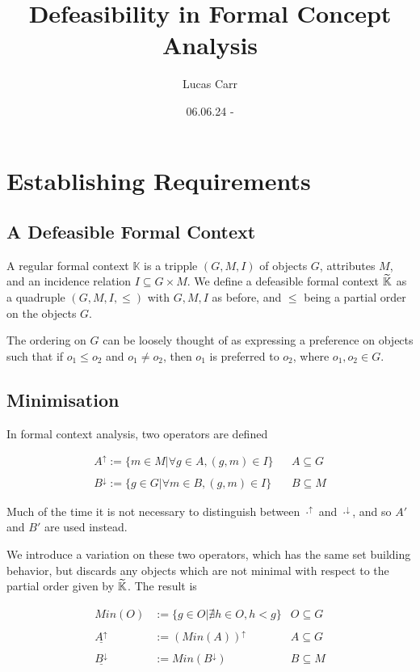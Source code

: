 \documentclass[11pt]{article}
\title{Defeasibility in Formal Concept Analysis}
\author{Lucas Carr}
\date{06.06.24 - }
\begin{document}
\maketitle
\tableofcontents

\section{Establishing Requirements}
\subsection{A Defeasible Formal Context}
A regular formal context $\mathbb{K}$ is a tripple $(G,M,I)$ of objects $G$, attributes $M$, and an incidence relation $I \subseteq G \times M$. We define a defeasible formal context $\widetilde{\mathbb{K}}$ as a quadruple $(G,M,I,\leq)$ with $G,M,I$ as before, and $\leq$ being a partial order on the objects $G$.

The ordering on $G$ can be loosely thought of as expressing a preference on objects such that if $o_1 \leq o_2$ and $o_1 \not = o_2$, then $o_1$ is preferred to $o_2$, where $o_1, o_2 \in G$.

\subsection{Minimisation}
In formal context analysis, two operators are defined

\begin{align*}
  A^{\uparrow} := \{m \in M | \forall g \in A, (g,m) \in I\}   &  & A \subseteq G \\
  \\
  B^{\downarrow} := \{g \in G | \forall m \in B, (g,m) \in I\} &  & B \subseteq M
\end{align*}

Much of the time it is not necessary to distinguish between $\cdot^{\uparrow}$ and $\cdot^{\downarrow}$, and so $A'$ and $B'$ are used instead.

We introduce a variation on these two operators, which has the same set building behavior, but discards any objects which are not minimal with respect to the partial order given by $\widetilde{\mathbb{K}}$. The result is

\begin{align*}
  Min(O)                     & := \{g \in O | \nexists h \in O, h < g \} & O \subseteq G \\
  \\
  \underline{A^{\uparrow}}   & := (Min(A))^{\uparrow}                    & A \subseteq G \\
  \\
  \underline{B^{\downarrow}} & := Min(B^{\downarrow})                    & B \subseteq M
\end{align*}
\end{document}
